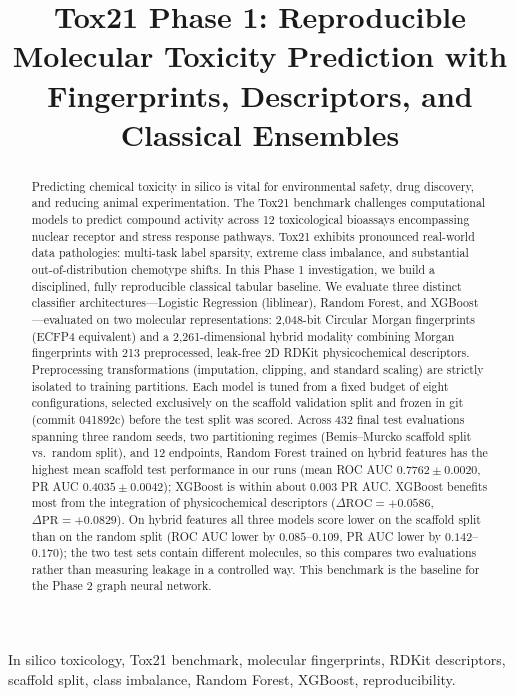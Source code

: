 \documentclass[conference]{IEEEtran}
\title{Tox21 Phase 1: Reproducible Molecular Toxicity Prediction with Fingerprints, Descriptors, and Classical Ensembles}
\author{
    \IEEEauthorblockN{Abhijeet Kumar, Raghav, Ranajeet, Parrv}
    \IEEEauthorblockA{\textit{Department of Computer Science and Engineering} \\
    \textit{Molecular Toxicity Prediction Consortium} \\
    Tox21 Phase 1 Benchmark Project}
}
\begin{document}
\maketitle

\begin{abstract}
Predicting chemical toxicity in silico is vital for environmental safety, drug discovery, and reducing animal experimentation. The Tox21 benchmark challenges computational models to predict compound activity across 12 toxicological bioassays encompassing nuclear receptor and stress response pathways. Tox21 exhibits pronounced real-world data pathologies: multi-task label sparsity, extreme class imbalance, and substantial out-of-distribution chemotype shifts. In this Phase 1 investigation, we build a disciplined, fully reproducible classical tabular baseline. We evaluate three distinct classifier architectures---Logistic Regression (liblinear), Random Forest, and XGBoost---evaluated on two molecular representations: 2,048-bit Circular Morgan fingerprints (ECFP4 equivalent) and a 2,261-dimensional hybrid modality combining Morgan fingerprints with 213 preprocessed, leak-free 2D RDKit physicochemical descriptors. Preprocessing transformations (imputation, clipping, and standard scaling) are strictly isolated to training partitions. Each model is tuned from a fixed budget of eight configurations, selected exclusively on the scaffold validation split and frozen in git (commit 041892c) before the test split was scored. Across 432 final test evaluations spanning three random seeds, two partitioning regimes (Bemis--Murcko scaffold split vs.\ random split), and 12 endpoints, Random Forest trained on hybrid features has the highest mean scaffold test performance in our runs (mean ROC AUC $0.7762 \pm 0.0020$, PR AUC $0.4035 \pm 0.0042$); XGBoost is within about $0.003$ PR AUC. XGBoost benefits most from the integration of physicochemical descriptors ($\Delta\text{ROC} = +0.0586$, $\Delta\text{PR} = +0.0829$). On hybrid features all three models score lower on the scaffold split than on the random split (ROC AUC lower by $0.085$--$0.109$, PR AUC lower by $0.142$--$0.170$); the two test sets contain different molecules, so this compares two evaluations rather than measuring leakage in a controlled way. This benchmark is the baseline for the Phase 2 graph neural network.
\end{abstract}

\begin{IEEEkeywords}
In silico toxicology, Tox21 benchmark, molecular fingerprints, RDKit descriptors, scaffold split, class imbalance, Random Forest, XGBoost, reproducibility.
\end{IEEEkeywords}











\end{document}
